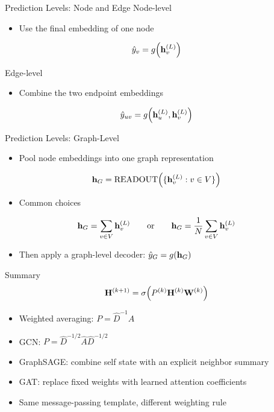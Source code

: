 \documentclass[10pt,aspectratio=169]{ntuabeamer}
\begin{document}

\begin{frame}{Prediction Levels: Node and Edge}
  \small
  \textcolor{ntuablue}{Node-level}
  \begin{itemize}
    \item Use the final embedding of one node
  \end{itemize}
  \[
    \hat{y}_{v} = g\!\left(\mathbf{h}_{v}^{(L)}\right)
  \]

  \textcolor{ntuablue}{Edge-level}
  \begin{itemize}
    \item Combine the two endpoint embeddings
  \end{itemize}
  \[
    \hat{y}_{uv} = g\!\left(\mathbf{h}_{u}^{(L)}, \mathbf{h}_{v}^{(L)}\right)
  \]
\end{frame}

\begin{frame}{Prediction Levels: Graph-Level}
  \small
  \begin{itemize}
    \item Pool node embeddings into one graph representation
  \end{itemize}
  \[
    \mathbf{h}_{G} =
    \operatorname{READOUT}\!\left(\{\mathbf{h}_{v}^{(L)} : v \in V\}\right)
  \]

  \begin{itemize}
    \item Common choices
  \end{itemize}
  \[
    \mathbf{h}_{G} =
    \sum_{v \in V} \mathbf{h}_{v}^{(L)}
    \qquad \text{or} \qquad
    \mathbf{h}_{G} =
    \frac{1}{N}\sum_{v \in V} \mathbf{h}_{v}^{(L)}
  \]

  \begin{itemize}
    \item Then apply a graph-level decoder: \(\hat{y}_{G} = g(\mathbf{h}_{G})\)
  \end{itemize}
\end{frame}

\begin{frame}{Summary}
  \[
    \mathbf{H}^{(k+1)} =
    \sigma\!\left(P^{(k)} \mathbf{H}^{(k)} \mathbf{W}^{(k)}\right)
  \]

  \begin{itemize}
    \item Weighted averaging: \(P = \hat{D}^{-1}\hat{A}\)
    \item GCN: \(P = \hat{D}^{-1/2}\hat{A}\hat{D}^{-1/2}\)
    \item GraphSAGE: combine self state with an explicit neighbor summary
    \item GAT: replace fixed weights with learned attention coefficients
    \item Same message-passing template, different weighting rule
  \end{itemize}
\end{frame}
\end{document}
